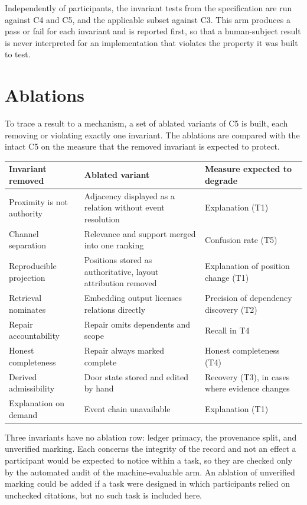 \documentclass[11pt]{article}
\theoremstyle{definition}
\begin{document}
Independently of participants, the invariant tests from the specification are run against C4 and C5, and the applicable subset against C3. This arm produces a pass or fail for each invariant and is reported first, so that a human-subject result is never interpreted for an implementation that violates the property it was built to test.

\section{Ablations}

To trace a result to a mechanism, a set of ablated variants of C5 is built, each removing or violating exactly one invariant. The ablations are compared with the intact C5 on the measure that the removed invariant is expected to protect.

\begin{table}[h]
\centering
\small
\begin{tabular}{@{}p{3.6cm}p{4.3cm}p{4.2cm}@{}}
\toprule
Invariant removed & Ablated variant & Measure expected to degrade\\
\midrule
Proximity is not authority & Adjacency displayed as a relation without event resolution & Explanation (T1)\\
Channel separation & Relevance and support merged into one ranking & Confusion rate (T5)\\
Reproducible projection & Positions stored as authoritative, layout attribution removed & Explanation of position change (T1)\\
Retrieval nominates & Embedding output licenses relations directly & Precision of dependency discovery (T2)\\
Repair accountability & Repair omits dependents and scope & Recall in T4\\
Honest completeness & Repair always marked complete & Honest completeness (T4)\\
Derived admissibility & Door state stored and edited by hand & Recovery (T3), in cases where evidence changes\\
Explanation on demand & Event chain unavailable & Explanation (T1)\\
\bottomrule
\end{tabular}
\end{table}

Three invariants have no ablation row: ledger primacy, the provenance split, and unverified marking. Each concerns the integrity of the record and not an effect a participant would be expected to notice within a task, so they are checked only by the automated audit of the machine-evaluable arm. An ablation of unverified marking could be added if a task were designed in which participants relied on unchecked citations, but no such task is included here.
\end{document}
